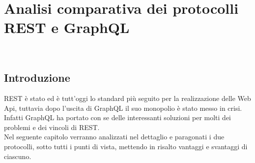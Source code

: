 
\chapter{Analisi comparativa dei protocolli REST e GraphQL}
\label{cap:analisi-comparativa}
\\
\section{Introduzione}
REST è stato ed è tutt'oggi lo standard più seguito per la realizzazione delle Web Api, tuttavia dopo l'uscita di GraphQL il suo monopolio è stato messo in crisi. Infatti GraphQL ha portato con se delle interessanti soluzioni per molti dei problemi e dei vincoli di REST.\\
Nel seguente capitolo verranno analizzati nel dettaglio e paragonati i due protocolli, sotto tutti i punti di vista, mettendo in risalto vantaggi e svantaggi di ciascuno.






